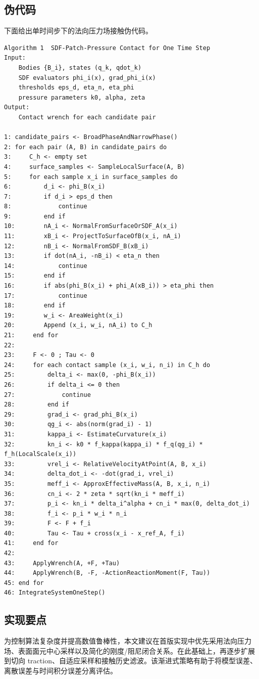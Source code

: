 \subsection{伪代码}
下面给出单时间步下的法向压力场接触伪代码。

\begin{lstlisting}
Algorithm 1  SDF-Patch-Pressure Contact for One Time Step
Input:
    Bodies {B_i}, states (q_k, qdot_k)
    SDF evaluators phi_i(x), grad_phi_i(x)
    thresholds eps_d, eta_n, eta_phi
    pressure parameters k0, alpha, zeta
Output:
    Contact wrench for each candidate pair

1: candidate_pairs <- BroadPhaseAndNarrowPhase()
2: for each pair (A, B) in candidate_pairs do
3:     C_h <- empty set
4:     surface_samples <- SampleLocalSurface(A, B)
5:     for each sample x_i in surface_samples do
6:         d_i <- phi_B(x_i)
7:         if d_i > eps_d then
8:             continue
9:         end if
10:        nA_i <- NormalFromSurfaceOrSDF_A(x_i)
11:        xB_i <- ProjectToSurfaceOfB(x_i, nA_i)
12:        nB_i <- NormalFromSDF_B(xB_i)
13:        if dot(nA_i, -nB_i) < eta_n then
14:            continue
15:        end if
16:        if abs(phi_B(x_i) + phi_A(xB_i)) > eta_phi then
17:            continue
18:        end if
19:        w_i <- AreaWeight(x_i)
20:        Append (x_i, w_i, nA_i) to C_h
21:     end for
22:
23:     F <- 0 ; Tau <- 0
24:     for each contact sample (x_i, w_i, n_i) in C_h do
25:         delta_i <- max(0, -phi_B(x_i))
26:         if delta_i <= 0 then
27:             continue
28:         end if
29:         grad_i <- grad_phi_B(x_i)
30:         qg_i <- abs(norm(grad_i) - 1)
31:         kappa_i <- EstimateCurvature(x_i)
32:         kn_i <- k0 * f_kappa(kappa_i) * f_q(qg_i) * f_h(LocalScale(x_i))
33:         vrel_i <- RelativeVelocityAtPoint(A, B, x_i)
34:         delta_dot_i <- -dot(grad_i, vrel_i)
35:         meff_i <- ApproxEffectiveMass(A, B, x_i, n_i)
36:         cn_i <- 2 * zeta * sqrt(kn_i * meff_i)
37:         p_i <- kn_i * delta_i^alpha + cn_i * max(0, delta_dot_i)
38:         f_i <- p_i * w_i * n_i
39:         F <- F + f_i
40:         Tau <- Tau + cross(x_i - x_ref_A, f_i)
41:     end for
42:
43:     ApplyWrench(A, +F, +Tau)
44:     ApplyWrench(B, -F, -ActionReactionMoment(F, Tau))
45: end for
46: IntegrateSystemOneStep()
\end{lstlisting}

\subsection{实现要点}
为控制算法复杂度并提高数值鲁棒性，本文建议在首版实现中优先采用法向压力场、表面面元中心采样以及简化的刚度/阻尼闭合关系。在此基础上，再逐步扩展到切向 traction、自适应采样和接触历史滤波。该渐进式策略有助于将模型误差、离散误差与时间积分误差分离评估。
